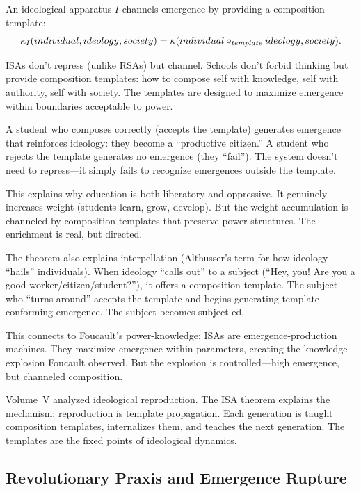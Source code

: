 \begin{theorem}
\label{thm:ideological-apparatus}
An ideological apparatus $I$ channels emergence by providing a composition
template:
\[
  \kappa_I(individual, ideology, society) =
  \kappa(individual \circ_{template} ideology, society).
\]
\end{theorem}

\begin{interpretation}
ISAs don't repress (unlike RSAs) but channel. Schools don't forbid thinking but
provide composition templates: how to compose self with knowledge, self with
authority, self with society. The templates are designed to maximize emergence
within boundaries acceptable to power.

A student who composes correctly (accepts the template) generates emergence that
reinforces ideology: they become a ``productive citizen.'' A student who rejects
the template generates no emergence (they ``fail''). The system doesn't need to
repress---it simply fails to recognize emergences outside the template.

This explains why education is both liberatory and oppressive. It genuinely
increases weight (students learn, grow, develop). But the weight accumulation
is channeled by composition templates that preserve power structures. The
enrichment is real, but directed.

The theorem also explains interpellation (Althusser's term for how ideology
``hails'' individuals). When ideology ``calls out'' to a subject (``Hey, you!
Are you a good worker/citizen/student?''), it offers a composition template. The
subject who ``turns around'' accepts the template and begins generating
template-conforming emergence. The subject becomes subject-ed.

This connects to Foucault's power-knowledge: ISAs are emergence-production
machines. They maximize emergence within parameters, creating the knowledge
explosion Foucault observed. But the explosion is controlled---high emergence,
but channeled composition.

Volume~V analyzed ideological reproduction. The ISA theorem explains the
mechanism: reproduction is template propagation. Each generation is taught
composition templates, internalizes them, and teaches the next generation. The
templates are the fixed points of ideological dynamics.
\end{interpretation}

\subsection{Revolutionary Praxis and Emergence Rupture}

